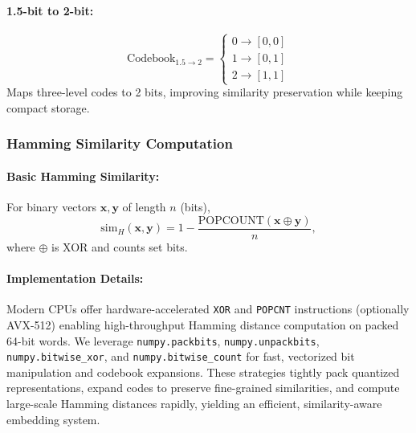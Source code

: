 \paragraph{1.5-bit to 2-bit:}
\begin{equation}
\text{Codebook}_{1.5\rightarrow2} =
\begin{cases}
0 \rightarrow [0,0]\\
1 \rightarrow [0,1]\\
2 \rightarrow [1,1]
\end{cases}
\end{equation}
Maps three-level codes to 2 bits, improving similarity preservation while keeping compact storage.

\subsubsection{Hamming Similarity Computation}
\paragraph{Basic Hamming Similarity:}
For binary vectors $\mathbf{x}, \mathbf{y}$ of length $n$ (bits),
\begin{equation}
    \text{sim}_H(\mathbf{x}, \mathbf{y}) 
    = 
    1 - \frac{\text{POPCOUNT}(\mathbf{x} \oplus \mathbf{y})}{n},
\end{equation}
where $\oplus$ is XOR and  counts set bits.

\paragraph{Implementation Details:} 
Modern CPUs offer hardware-accelerated \texttt{XOR} and \texttt{POPCNT} instructions (optionally AVX-512) enabling high-throughput Hamming distance computation on packed 64-bit words.
We leverage \texttt{numpy.packbits}, \texttt{numpy.unpackbits}, \texttt{numpy.bitwise\_xor}, and \texttt{numpy.bitwise\_count} for fast, vectorized bit manipulation and codebook expansions.
These strategies tightly pack quantized representations, expand codes to preserve fine-grained similarities, and compute large-scale Hamming distances rapidly, yielding an efficient, similarity-aware embedding system.